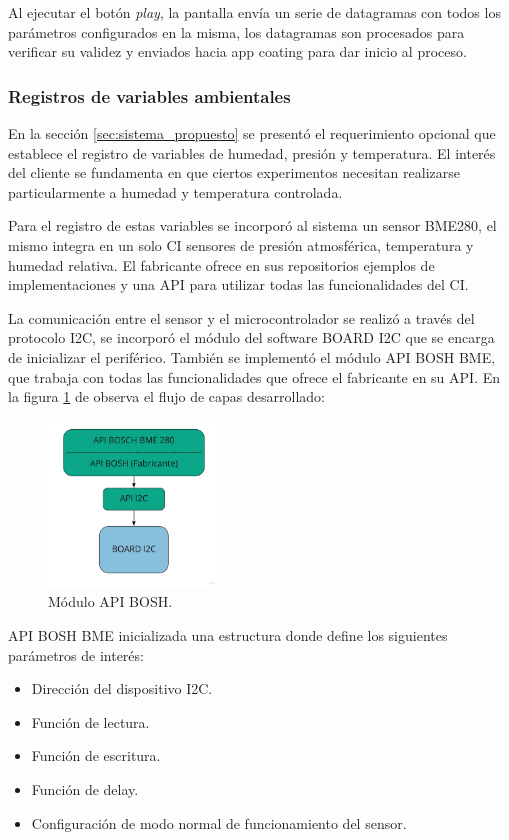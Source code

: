Al ejecutar el botón \textit{play}, la pantalla envía un serie de datagramas con todos los parámetros configurados en la misma, los datagramas son procesados para verificar su validez y enviados hacia app coating para dar inicio al proceso. 
 

\subsubsection{Registros de variables ambientales}

En la sección \ref{sec:sistema_propuesto} se presentó el requerimiento opcional que establece el registro de variables de humedad, presión y temperatura. El interés del cliente se fundamenta en que ciertos experimentos necesitan realizarse particularmente a humedad y temperatura controlada. 

Para el registro de estas variables se incorporó al sistema un sensor BME280, el mismo integra en un solo CI sensores de presión atmosférica, temperatura y humedad relativa. El fabricante ofrece en sus repositorios \citep{web_repositorio_api_bosh} ejemplos de implementaciones y una API para utilizar todas las funcionalidades del CI.

La comunicación entre el sensor y el microcontrolador se realizó a través del protocolo I2C, se incorporó el módulo del software BOARD I2C que se encarga de inicializar el periférico. También se implementó el módulo API BOSH BME, que trabaja con todas las funcionalidades que ofrece el fabricante en su API. En la figura \ref{fig:api_bosh} de observa el flujo de capas desarrollado:

\begin{figure}[h!]
	\centering
	\includegraphics[width=0.4\textwidth]{./Figures/api_bosh_bme.jpg}
	\caption{Módulo API BOSH.}
	\label{fig:api_bosh}
\end{figure}

API BOSH BME inicializada una estructura donde define los siguientes parámetros de interés:
\begin{itemize}
\item Dirección del dispositivo I2C.
\item Función de lectura.
\item Función de escritura.
\item Función de delay.
\item Configuración de modo normal de funcionamiento del sensor. 
\end{itemize}

